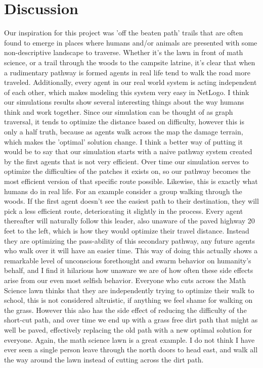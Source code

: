\documentclass[conference]{IEEEtran}
\begin{document}
\section{Discussion} 
	Our inspiration for this project was 'off the beaten path' trails that are often found to emerge in places where humans and/or animals are presented with some non-descriptive landscape to traverse. Whether it's the lawn in front of math science, or a trail through the woods to the campsite latrine, it's clear that when a rudimentary pathway is formed agents in real life tend to walk the road more traveled. Additionally, every agent in our real world system is acting independent of each other, which makes modeling this system very easy in NetLogo. 
	I think our simulations results show several interesting things about the way humans think and work together. Since our simulation can be thought of as graph traversal, it tends to optimize the distance based on difficulty, however this is only a half truth, because as agents walk across the map the damage terrain, which makes the 'optimal' solution change. I think a better way of putting it would be to say that our simulation starts with a naive pathway system created by the first agents that is not very efficient. Over time our simulation serves to optimize the difficulties of the patches it exists on, so our pathway becomes the most efficient version of that specific route possible.
Likewise, this is exactly what humans do in real life. For an example consider a group walking through the woods. If the first agent doesn't see the easiest path to their destination, they will pick a less efficient route, deteriorating it slightly in the process. Every agent thereafter will naturally follow this leader, also unaware of the paved highway 20 feet to the left, which is how they would optimize their travel distance. Instead they are optimizing the pass-ability of this secondary pathway, any future agents who walk over it will have an easier time.
This way of doing this actually shows a remarkable level of unconscious forethought and swarm behavior on humanity's behalf, and I find it hilarious how unaware we are of how often these side effects arise from our even most selfish behavior. Everyone who cuts across the Math Science lawn thinks that they are independently trying to optimize their walk to school, this is not considered altruistic, if anything we feel shame for walking on the grass. However this also has the side effect of reducing the difficulty of the short-cut path, and over time we end up with a grass free dirt path that might as well be paved, effectively replacing the old path with a new optimal solution for everyone. Again, the math science lawn is a great example. I do not think I have ever seen a single person leave through the north doors to head east, and walk all the way around the lawn instead of cutting across the dirt path. 
\end{document}
